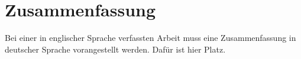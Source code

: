 \section*{Zusammenfassung}

Bei einer in englischer Sprache verfassten Arbeit muss eine Zusammenfassung in deutscher Sprache vorangestellt werden.
Daf\"ur ist hier Platz.

\newpage
